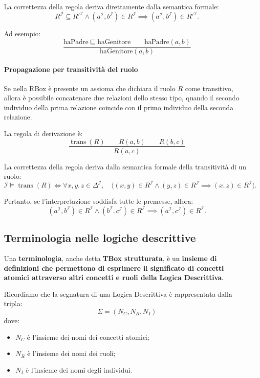 La correttezza della regola deriva direttamente dalla
semantica formale:
\[
    R^{\mathcal{I}} \subseteq R'^{\mathcal{I}}
    \land
    (a^{\mathcal{I}},b^{\mathcal{I}}) \in R^{\mathcal{I}}
    \implies
    (a^{\mathcal{I}},b^{\mathcal{I}}) \in R'^{\mathcal{I}}.
\]

Ad esempio:
\[
    \frac{
        \text{haPadre} \sqsubseteq \text{haGenitore}
        \qquad
        \text{haPadre}(a,b)
    }{
        \text{haGenitore}(a,b)
    }
\]

\paragraph{Propagazione per transitività del ruolo}

Se nella RBox è presente un assioma che dichiara il
ruolo $R$ come transitivo, allora è possibile concatenare
due relazioni dello stesso tipo, quando il secondo
individuo della prima relazione coincide con il primo
individuo della seconda relazione.

La regola di derivazione è:
\[
    \frac{\operatorname{trans}(R)
          \qquad R(a,b)
          \qquad R(b,c)}
         {R(a,c)}
\]

La correttezza della regola deriva dalla semantica formale
della transitività di un ruolo:
\[
    \mathcal{I} \models \operatorname{trans}(R)
    \iff
    \forall x,y,z \in \Delta^{\mathcal{I}}, \quad
    \bigl(
        (x,y) \in R^{\mathcal{I}}
        \land
        (y,z) \in R^{\mathcal{I}}
        \implies
        (x,z) \in R^{\mathcal{I}}
    \bigr).
\]

Pertanto, se l'interpretazione soddisfa tutte le premesse,
allora:
\[
    (a^{\mathcal{I}},b^{\mathcal{I}}) \in R^{\mathcal{I}}
    \land
    (b^{\mathcal{I}},c^{\mathcal{I}}) \in R^{\mathcal{I}}
    \implies
    (a^{\mathcal{I}},c^{\mathcal{I}}) \in R^{\mathcal{I}}.
\]

\newpage

\subsection{Terminologia nelle logiche descrittive}

Una \textbf{terminologia}, anche detta \textbf{TBox strutturata},
è un \textbf{insieme di definizioni che permettono di esprimere il
significato di concetti atomici attraverso altri concetti e ruoli
della Logica Descrittiva}.

Ricordiamo che la segnatura di una Logica Descrittiva è
rappresentata dalla tripla:
\[
    \Sigma = (N_C, N_R, N_I)
\]
dove:
\begin{itemize}
    \item $N_C$ è l'insieme dei nomi dei concetti atomici;
    \item $N_R$ è l'insieme dei nomi dei ruoli;
    \item $N_I$ è l'insieme dei nomi degli individui.
\end{itemize}

